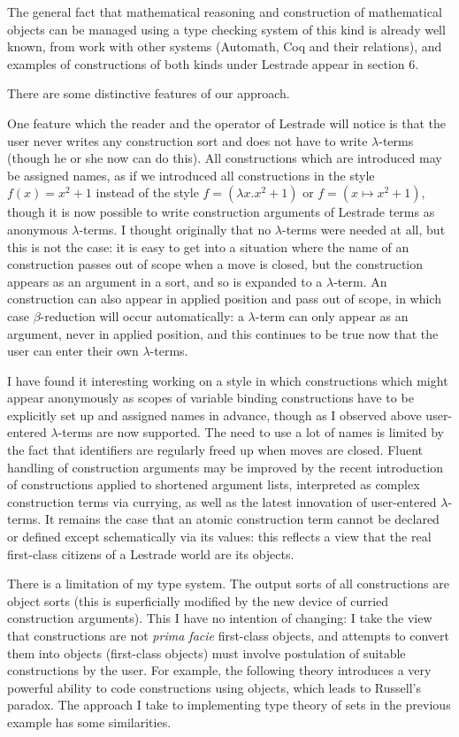 \documentclass[12pt]{article}
\begin{document}
The general fact that mathematical reasoning and construction of mathematical objects can be managed using a type checking system of this kind is already well known, from work with other systems (Automath, Coq and their relations),
and examples of constructions of both kinds under Lestrade appear in section 6.

There are some distinctive features of our approach.

One feature which the reader and the operator of Lestrade will notice is that the user never writes any construction sort and does not have to write $\lambda$-terms (though he or she now can do this).   All constructions which are introduced may be assigned names, as if we introduced all constructions in the style $f(x) = x^2+1$ instead of the style $f=(\lambda x.x^2+1)$ or $f=(x \mapsto x^2+1)$, though it is now possible to write construction arguments of Lestrade terms as anonymous $\lambda$-terms.   I thought originally
that no $\lambda$-terms were needed at all, but this is not the case:   it is easy to get into a situation where the name of an construction passes out of scope when a move is closed,
but the construction appears as an argument in a sort, and so is expanded to a $\lambda$-term.  An construction can also appear in applied position and pass out of scope,
in which case $\beta$-reduction will occur automatically:  a $\lambda$-term can only appear as an argument, never in applied position, and this continues to be true now that the user can enter their own $\lambda$-terms.

I have found it interesting working on a style in which constructions which might appear anonymously as scopes of variable binding constructions have to be explicitly set up and assigned names in advance, though as I observed above user-entered $\lambda$-terms are now supported.   The need to use a lot of names is limited by the fact that identifiers are regularly freed up when moves are closed.  Fluent handling of construction arguments may be improved by the recent introduction of constructions applied to shortened argument lists, interpreted as complex construction terms via currying, as well as the latest innovation of user-entered $\lambda$-terms.  It remains the case that an atomic construction term cannot be declared or defined except schematically via its values:  this reflects a view that the real first-class citizens of a Lestrade world are its objects.

There is a limitation of my type system.   The output sorts of all constructions are object sorts (this is superficially modified by the new device of curried construction arguments).  This I have no intention of changing:  I take the view that constructions are not {\em prima facie} first-class objects, and attempts to convert them into objects (first-class objects) must involve postulation of suitable constructions by the user.   For example, the following theory introduces a very powerful ability to code constructions using objects, which leads to Russell's paradox.   The approach I take to implementing type theory of sets in the previous example has some similarities.
\end{document}
